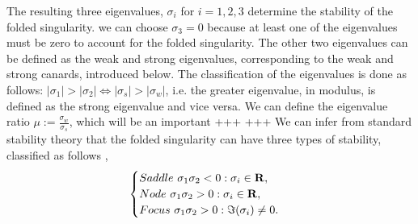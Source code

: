 The resulting three eigenvalues, $ \sigma_i $ for $ i=1,2,3 $ \citep{MMO} determine the stability of the folded singularity. \Wlg we can choose $ \sigma_3=0 $ because at least one of the eigenvalues must be zero to account for the folded singularity.
The other two eigenvalues can be defined as the weak and strong eigenvalues, corresponding to the weak and strong canards, introduced below. The classification of the eigenvalues is done as follows: $ |\sigma_1|>|\sigma_2| \iff |\sigma_s|>|\sigma_w| $, i.e. the greater eigenvalue, in modulus, is defined as the strong eigenvalue and vice versa.
We can define the eigenvalue ratio $\mu:= \frac{\sigma_w}{\sigma_s}$, which will be an important +++ +++
We can infer from standard stability theory that the folded singularity can have three types of stability, classified as follows \citep{MMO},
\begin{equation}
\begin{cases}
Saddle \ \sigma_1\sigma_2<0: \sigma_i\in\mathbf{R},\\
Node \ \sigma_1\sigma_2>0: \sigma_i\in\mathbf{R},\\
Focus \ \sigma_1\sigma_2>0: \Im(\sigma_i)\neq 0.
\end{cases}
\end{equation}

